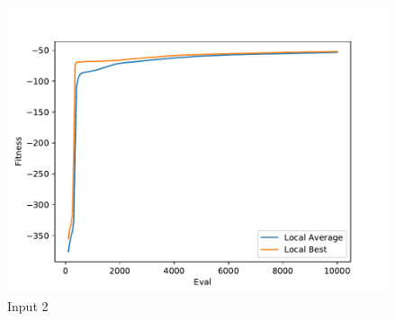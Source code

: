 \documentclass{standalone}
\begin{document}
\begin{figure}[!htb]
	\caption{Input 2}
	\label{fig:graph_2058}
	\includegraphics[width=\textwidth]{../graphs/graphs/2058.pdf}
\end{figure}
\end{document}
